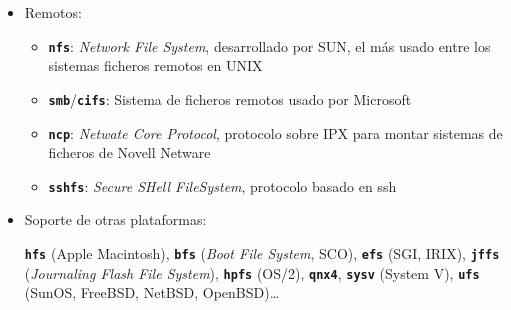 \documentclass[ucs]{beamer}
\begin{document}
\begin{frame}[fragile]
  \begin{itemize}
  \item Remotos:
    \begin{itemize}
    \item \texttt{\textbf{nfs}}: \emph{Network File System},
      desarrollado por SUN, el más usado entre los sistemas ficheros
      remotos en UNIX
    \item \texttt{\textbf{smb}}/\texttt{\textbf{cifs}}: Sistema de
      ficheros remotos usado por Microsoft
    \item \texttt{\textbf{ncp}}: \emph{Netwate Core Protocol},
      protocolo sobre IPX para montar sistemas de ficheros de Novell
      Netware
    \item \texttt{\textbf{sshfs}}: \emph{Secure SHell FileSystem},
protocolo basado en ssh
    \end{itemize}




\item
Soporte de otras plataformas:

    \texttt{\textbf{hfs}} (Apple Macintosh),
 \texttt{\textbf{bfs}} (\emph{Boot File System}, SCO),
    \texttt{\textbf{efs}} (SGI, IRIX), \texttt{\textbf{jffs}}
    (\emph{Journaling Flash File System}), 
\texttt{\textbf{hpfs}} (OS/2),
    \texttt{\textbf{qnx4}}, \texttt{\textbf{sysv}} (System V),
    \texttt{\textbf{ufs}} (SunOS, FreeBSD, NetBSD, OpenBSD)\ldots

  \end{itemize}
\end{frame}
\end{document}
